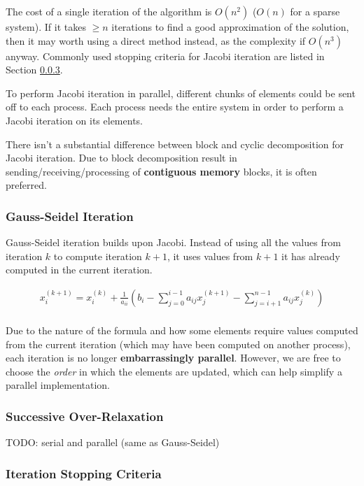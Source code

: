\documentclass{article}
\begin{document}
The cost of a single iteration of the algorithm is $O(n^2)$ ($O(n)$ for a sparse system). If it takes $\geq n$ iterations to find a good approximation of the solution, then it may worth using a direct method instead, as the complexity if $O(n^3)$ anyway. Commonly used stopping criteria for Jacobi iteration are listed in Section \ref{sec:stopping-criteria}.

To perform Jacobi iteration in parallel, different chunks of elements could be sent off to each process. Each process needs the entire system in order to perform a Jacobi iteration on its elements.

There isn't a substantial difference between block and cyclic decomposition for Jacobi iteration. Due to block decomposition result in sending/receiving/processing of \textbf{contiguous memory} blocks, it is often preferred.

\subsubsection{Gauss-Seidel Iteration}

Gauss-Seidel iteration builds upon Jacobi. Instead of using all the values from iteration $k$ to compute iteration $k+1$, it uses values from $k+1$ it has already computed in the current iteration.

\begin{multline}
	x_i^{(k+1)} = x_i^{(k)} + \frac{1}{a_{ii}}(b_i - \sum_{j=0}^{i - 1} {a_{ij}x_{j}^{(k+1)}} - \sum_{j=i+1}^{n - 1} {a_{ij}x_{j}^{(k)}})
	\\
	\label{eq:gauss-seidel-elembyelem}
\end{multline}

Due to the nature of the formula and how some elements require values computed from the current iteration (which may have been computed on another process), each iteration is no longer \textbf{embarrassingly parallel}. However, we are free to choose the \textit{order} in which the elements are updated, which can help simplify a parallel implementation.

\subsubsection{Successive Over-Relaxation}

TODO: serial and parallel (same as Gauss-Seidel)

\subsubsection{Iteration Stopping Criteria}
\label{sec:stopping-criteria}
\end{document}
